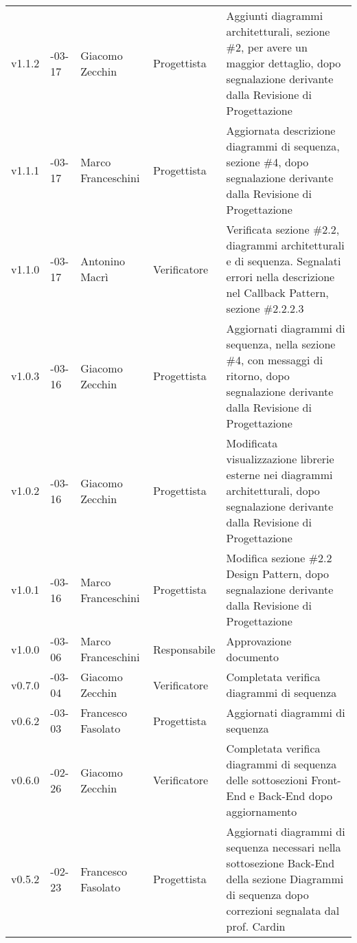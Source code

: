 \begin{longtable} { >{\centering}p{1.4cm} >{\centering}p{2cm} >{\centering}p{2.3cm} >{\centering}p{2.7cm} p{5.5cm} }
	\addlinespace[0.4em]
	\midrule
	\addlinespace[0.4em]
	v1.1.2 & 2017-03-17 &  Giacomo Zecchin & Progettista & Aggiunti diagrammi architetturali, sezione \#2, per avere un maggior dettaglio, dopo segnalazione derivante dalla Revisione di Progettazione \\
	\addlinespace[0.4em]
	\midrule
	\addlinespace[0.4em]
	v1.1.1 & 2017-03-17 &  Marco Franceschini & Progettista & Aggiornata descrizione diagrammi di sequenza, sezione \#4, dopo segnalazione derivante dalla Revisione di Progettazione \\
	\addlinespace[0.4em]
	\midrule
	\addlinespace[0.4em]
	v1.1.0 & 2017-03-17 &  Antonino Macrì & Verificatore & Verificata sezione \#2.2, diagrammi architetturali e di sequenza. Segnalati errori nella descrizione nel Callback Pattern, sezione \#2.2.2.3 \\
	\addlinespace[0.4em]
	\midrule
	\addlinespace[0.4em]
	v1.0.3 & 2017-03-16 &  Giacomo Zecchin & Progettista & Aggiornati diagrammi di sequenza, nella sezione \#4, con messaggi di ritorno, dopo segnalazione derivante dalla Revisione di Progettazione \\
	\addlinespace[0.4em]
	\midrule
	\addlinespace[0.4em]
	v1.0.2 & 2017-03-16 &  Giacomo Zecchin & Progettista & Modificata visualizzazione librerie esterne nei diagrammi architetturali, dopo segnalazione derivante dalla Revisione di Progettazione  \\
	\addlinespace[0.4em]
	\midrule
	\addlinespace[0.4em]
	v1.0.1 & 2017-03-16 &  Marco Franceschini & Progettista & Modifica sezione \#2.2 Design Pattern, dopo segnalazione derivante dalla Revisione di Progettazione \\
	\addlinespace[0.4em]
	\midrule
	\addlinespace[0.4em]
	v1.0.0 & 2017-03-06 &  Marco Franceschini & Responsabile & Approvazione documento \\
	\addlinespace[0.4em]
	\midrule
	\addlinespace[0.4em]
	v0.7.0 & 2017-03-04 & Giacomo Zecchin & Verificatore & Completata verifica diagrammi di sequenza \\
	\addlinespace[0.4em]
	\midrule
	\addlinespace[0.4em]
	v0.6.2 & 2017-03-03 & Francesco Fasolato & Progettista & Aggiornati diagrammi di sequenza \\
	\addlinespace[0.4em]
	\midrule
	\addlinespace[0.4em]
	v0.6.0 & 2017-02-26 & Giacomo Zecchin & Verificatore & Completata verifica diagrammi di sequenza delle sottosezioni Front-End e Back-End dopo aggiornamento \\
	\addlinespace[0.4em]
	\midrule
	\addlinespace[0.4em]
	v0.5.2 & 2017-02-23 & Francesco Fasolato & Progettista & Aggiornati diagrammi di sequenza necessari nella sottosezione Back-End della sezione Diagrammi di  sequenza dopo correzioni segnalata dal prof. Cardin  \\

\end{longtable}
